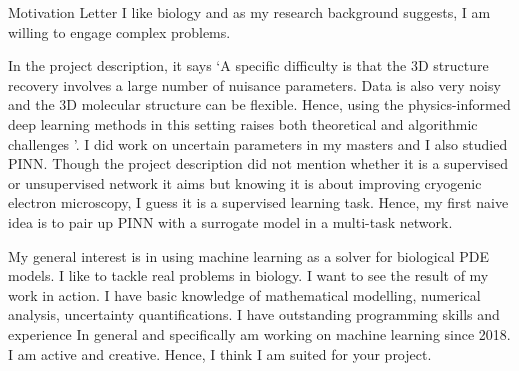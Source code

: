 \begin{cSection}{Motivation Letter}
	I like biology and as my research background suggests, I am willing to engage complex problems. 
	
	In the project description, it says `A specific difficulty is that the 3D structure recovery involves a large number of nuisance parameters. Data is also very noisy and the 3D molecular structure can be flexible. Hence, using the physics-informed deep learning methods in this setting raises both theoretical and algorithmic challenges '.  I did work on uncertain parameters in my masters and I also studied PINN. Though the project description did not mention whether it is a supervised or unsupervised network it aims but knowing it is about improving cryogenic electron microscopy, I guess it is a supervised learning task. Hence, my first naive idea is to pair up PINN with a surrogate model in a multi-task network. 
	
	My general interest is in using machine learning as a solver for biological PDE models. I like to tackle real problems in biology. I want to see the result of my work in action. I have basic knowledge of mathematical modelling, numerical analysis, uncertainty quantifications. I have outstanding programming skills and experience In general and specifically am working on machine learning since 2018. I am active and creative. Hence, I think I am suited for your project.
	\normalfont	
\end{cSection}

